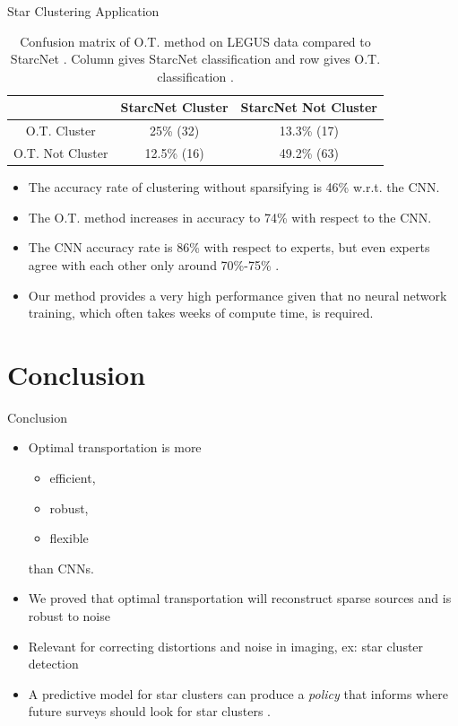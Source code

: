 \documentclass{beamer}
\begin{document}
\begin{frame}{Star Clustering Application \cite{rawson_astro}}
\vspace{-6ex}
\begin{table}
\caption{Confusion matrix of O.T. method on LEGUS data compared to StarcNet \cite{perez_starcnet_2021}. Column gives StarcNet classification and row gives O.T. classification \cite{rawson_astro}.}
\begin{center}
\begin{tabular}{c|c|c|}
 & StarcNet Cluster & StarcNet Not Cluster \\
\hline
O.T. Cluster     & 25\% (32) & 13.3\% (17)  \\
\hline
O.T. Not Cluster & 12.5\% (16) & 49.2\% (63)  \\
\hline
\end{tabular}
\label{table:2}
\end{center}
\end{table}
\small
 \pause
 \begin{itemize}
    \item The accuracy rate of clustering without sparsifying is 46\% w.r.t. the CNN.  \pause
    \item The O.T. method increases in accuracy to 74\% with respect to the CNN.  \pause
    \item The CNN accuracy rate is 86\% with respect to experts, but even experts agree with each other only around 70\%-75\% \cite{ wei_deep_2020}.  \pause
    \item Our method provides a very high performance given that no neural network training, which often takes weeks of compute time, is required. 
\end{itemize}

\end{frame}

\section{Conclusion}

\begin{frame}{Conclusion}
\begin{itemize}
    \item 
Optimal transportation is more 
\begin{itemize}
    \item efficient,  \pause
    \item robust,  \pause
    \item flexible  
\end{itemize}
than CNNs. \pause
\item We proved that optimal transportation will reconstruct sparse sources and is robust to noise
\item Relevant for correcting distortions and noise in imaging, ex: star cluster detection
\item A predictive model for star clusters can produce a \emph{policy} that informs where future surveys should look for star clusters \cite{rawson_deep_2021, freeman}. 

\end{itemize}

\end{frame}
\end{document}
